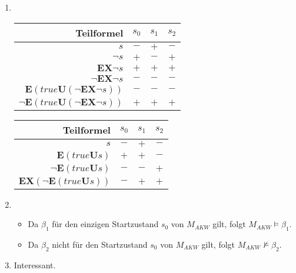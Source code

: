 \documentclass[a4paper]{scrartcl}
\begin{document}
\begin{enumerate}
    \item \hfill \\
        \begin{table}[h]
            \begin{subtable}{0.5\textwidth}
                \begin{tabular}{r|ccc}
                    Teilformel & $s_0$ & $s_1$ & $s_2$ \\ \hline
                    $s$ & $-$ & $+$ & $-$ \\
                    $\lnot s$ & $+$ & $-$ & $+$ \\
                    $\textbf{EX} \lnot s$ & $+$ & $+$ & $+$ \\
                    $\lnot \textbf{EX} \lnot s$ & $-$ & $-$ & $-$ \\
                    $\textbf{E} (true \textbf{U} (\lnot \textbf{EX} \lnot s))$ & $-$ & $-$ & $-$ \\
                    $\lnot \textbf{E} (true \textbf{U} (\lnot \textbf{EX} \lnot s))$ & $+$ & $+$ & $+$ \\
                \end{tabular}
            \end{subtable}
            \begin{subtable}{0.5\textwidth}
                \begin{tabular}{r|ccc}
                    Teilformel & $s_0$ & $s_1$ & $s_2$ \\ \hline
                    $s$ & $-$ & $+$ & $-$ \\
                    $\textbf{E} (true \textbf{U} s)$ & $+$ & $+$ & $-$ \\
                    $\lnot \textbf{E} (true \textbf{U} s)$ & $-$ & $-$ & $+$ \\
                    $\textbf{EX}(\lnot \textbf{E} (true \textbf{U} s))$ & $-$ & $+$ & $+$ \\
                \end{tabular}
            \end{subtable}
        \end{table}

    \item
        \begin{itemize}
            \item Da $\beta_1$ für den einzigen Startzustand $s_0$ von $M_{AKW}$
                gilt, folgt $M_{AKW} \models \beta_1$.
            \item Da $\beta_2$ nicht für den Startzustand $s_0$ von $M_{AKW}$
                gilt, folgt $M_{AKW} \not\models \beta_2$.
        \end{itemize}

    \item Interessant.

\end{enumerate}
\end{document}
